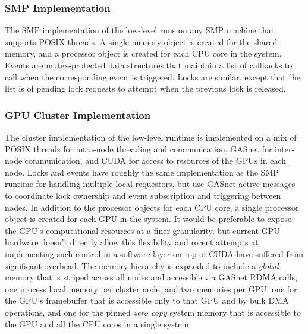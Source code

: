 

\subsubsection{SMP Implementation}
\label{subsec:smpimpl}
The SMP implementation of the low-level runs on any SMP machine that supports 
POSIX threads.  A single memory object is created for the shared memory, and 
a processor object is created for
each CPU core in the system.  Events are 
mutex-protected data structures that maintain a list of callbacks to call when
the corresponding event is triggered.  Locks are similar, except that the list
is of pending lock requests to attempt when the previous lock is released.

\subsubsection{GPU Cluster Implementation}
\label{subsec:clusterimpl}
The cluster implementation of the low-level runtime is implemented on a mix
of POSIX threads for intra-node threading and communication, GASnet for 
inter-node communication, and CUDA for access to resources of the GPUs in 
each node.  Locks and events have roughly the same implementation as the SMP
runtime for handling multiple local requestors, but use GASnet active messages
to coordinate lock ownership and event subscription and triggering between
nodes.  In addition to the processor objects for each CPU core, a single
processor object is created for each GPU in the system.  It would be preferable
to expose the GPU's computational resources at a finer granularity, but
current GPU hardware doesn't directly allow this flexibility and recent attempts
at implementing such control in a software layer on top of CUDA have suffered
from significant overhead.  The memory hierarchy is expanded to include a 
{\em global} memory that is striped across all nodes and accessible via GASnet
RDMA calls, one process local memory per cluster node, and two memories per GPU: one for the GPU's framebuffer that is
accessible only to that GPU and by bulk DMA operations, and one for the pinned
{\em zero copy} system memory that is accessible to the GPU and all the CPU cores
in a single system.
